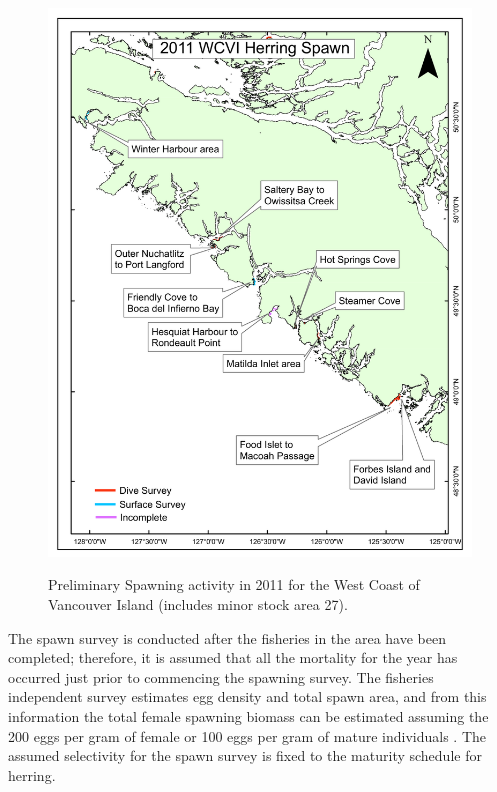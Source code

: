 \begin{figure}[!tbp]
	\ContinuedFloat
	\centering
	\includegraphics[scale=0.5]{../Figs/PBSfigs/2011_spawn_WCVI_August16.pdf}\\
	\caption{Preliminary Spawning activity in 2011 for the West Coast of Vancouver Island (includes minor stock area 27).}\label{figSpawnMaps}
\end{figure}

	The spawn survey is conducted after the fisheries in the area have been completed; therefore, it is assumed that all the mortality for the year has occurred just prior to commencing the spawning survey. The fisheries independent survey estimates egg density and total spawn area, and from this information the total female spawning biomass can be estimated assuming the 200 eggs per gram of female  or 100 eggs per gram of mature  individuals \citep{hay1985reproductive,hardwick1973biomass}. The assumed selectivity for the spawn survey is fixed to the maturity schedule for herring.  	
	
